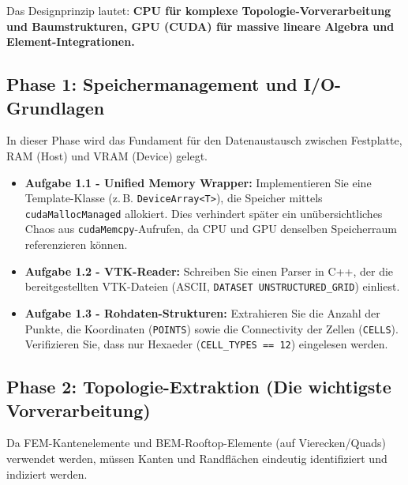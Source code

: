 \documentclass[11pt,a4paper]{article}
\begin{document}
Das Designprinzip lautet: \textbf{CPU für komplexe Topologie-Vorverarbeitung und Baumstrukturen, GPU (CUDA) für massive lineare Algebra und Element-Integrationen.}

\subsection{Phase 1: Speichermanagement und I/O-Grundlagen}
In dieser Phase wird das Fundament für den Datenaustausch zwischen Festplatte, RAM (Host) und VRAM (Device) gelegt.

\begin{itemize}
    \item \textbf{Aufgabe 1.1 - Unified Memory Wrapper:} Implementieren Sie eine Template-Klasse (z.\,B. \texttt{DeviceArray<T>}), die Speicher mittels \texttt{cudaMallocManaged} allokiert. Dies verhindert später ein unübersichtliches Chaos aus \texttt{cudaMemcpy}-Aufrufen, da CPU und GPU denselben Speicherraum referenzieren können.
    \item \textbf{Aufgabe 1.2 - VTK-Reader:} Schreiben Sie einen Parser in C++, der die bereitgestellten VTK-Dateien (ASCII, \texttt{DATASET UNSTRUCTURED\_GRID}) einliest.
    \item \textbf{Aufgabe 1.3 - Rohdaten-Strukturen:} Extrahieren Sie die Anzahl der Punkte, die Koordinaten (\texttt{POINTS}) sowie die Connectivity der Zellen (\texttt{CELLS}). Verifizieren Sie, dass nur Hexaeder (\texttt{CELL\_TYPES == 12}) eingelesen werden.
\end{itemize}

\subsection{Phase 2: Topologie-Extraktion (Die wichtigste Vorverarbeitung)}
Da FEM-Kantenelemente und BEM-Rooftop-Elemente (auf Vierecken/Quads) verwendet werden, müssen Kanten und Randflächen eindeutig identifiziert und indiziert werden.
\end{document}
